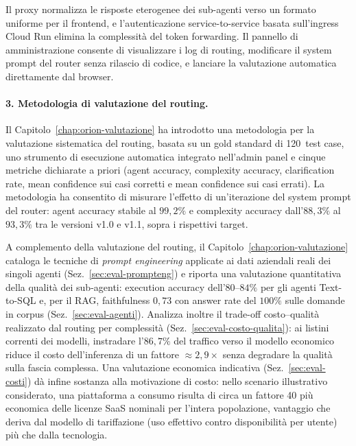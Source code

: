 Il proxy normalizza le risposte eterogenee dei sub-agenti verso un formato uniforme per il frontend, 
e l'autenticazione service-to-service basata sull'ingress Cloud Run elimina la complessità del token forwarding. 
Il pannello di amministrazione consente di visualizzare i log di routing, modificare il system prompt del router senza rilascio di codice, 
e lanciare la valutazione automatica direttamente dal browser.

\paragraph{3. Metodologia di valutazione del routing.} Il Capitolo~\ref{chap:orion-valutazione} ha introdotto una metodologia per la valutazione sistematica del routing, 
basata su un gold standard di 120~test case, uno strumento di esecuzione automatica integrato nell'admin panel e cinque metriche dichiarate a priori
(agent accuracy, complexity accuracy, clarification rate, mean confidence sui casi corretti e mean confidence sui casi errati). 
La metodologia ha consentito di misurare l'effetto di un'iterazione del system prompt del router: 
agent accuracy stabile al $99{,}2\%$ e complexity accuracy dall'$88{,}3\%$ al $93{,}3\%$ tra le versioni v1.0 e v1.1, sopra i rispettivi target.

A complemento della valutazione del routing, il Capitolo~\ref{chap:orion-valutazione} cataloga le tecniche di \emph{prompt engineering} applicate ai dati aziendali reali dei singoli agenti (Sez.~\ref{sec:eval-prompteng})
e riporta una valutazione quantitativa della qualità dei sub-agenti:
execution accuracy dell'$80$--$84\%$ per gli agenti Text-to-SQL e, per il RAG, faithfulness $0{,}73$ con answer rate del $100\%$ sulle domande in corpus (Sez.~\ref{sec:eval-agenti}).
Analizza inoltre il trade-off costo--qualità realizzato dal routing per complessità (Sez.~\ref{sec:eval-costo-qualita}): ai listini correnti dei modelli, instradare l'$86{,}7\%$ del traffico verso il modello economico riduce il costo dell'inferenza di un fattore $\approx 2{,}9\times$ senza degradare la qualità sulla fascia complessa.
Una valutazione economica indicativa (Sez.~\ref{sec:eval-costi}) dà infine sostanza alla motivazione di costo: nello scenario illustrativo considerato,
una piattaforma a consumo risulta di circa un fattore 40 più economica delle licenze SaaS nominali per l'intera popolazione,
vantaggio che deriva dal modello di tariffazione (uso effettivo contro disponibilità per utente) più che dalla tecnologia.

